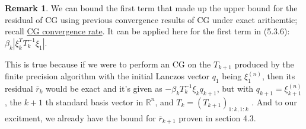 \documentclass[]{article}
\theoremstyle{definition}
\newtheorem{remark}{Remark}[subsection]
\begin{document}
            \begin{remark}\label{remark:CG_Float_Remark}
                We can bound the first term that made up the upper bound for the residual of CG using previous convergence results of CG under exact arithemtic; recall \hyperref[theorem:CG_Convergence_Rate]{CG convergence rate}. It can be applied here for the first term in (5.3.6): 
                $\beta_k |
                \xi_k^T T_k^{-1}\xi_1|$. 
                \par
                This is true because if we were to perform an CG on the $T_{k + 1}$ produced by the finite precision algorithm with the initial Lanczos vector $q_1$ being $\xi_1^{(n)}$, then its residual $\overline{r}_{k}$ would be exact and it's given as $-\beta_kT_{k}^{-1}\xi_kq_{k + 1}$, but with $q_{k + 1} = \xi_{k + 1}^{(n)}$, the $k + 1$ th standard basis vector in $\mathbb R^{n}$, and $T_k = (T_{k + 1})_{1:k, 1:k}$ . And to our excitment, we already have the bound for $\overline{r}_{k+1}$ proven in section 4.3. 
            \end{remark}
\end{document}

